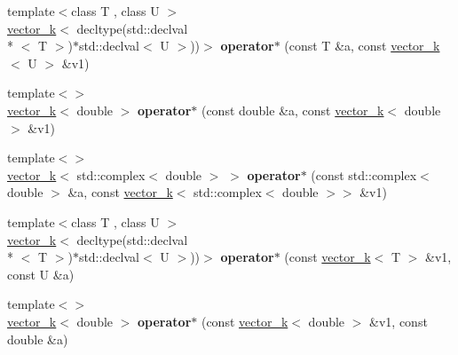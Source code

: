 \begin{DoxyCompactItemize}
\item 
\hypertarget{namespacekeycpp_a6e4d2d791a5cbcbcf90de5da2250b4c8}{{\footnotesize template$<$class T , class U $>$ }\\\hyperlink{classkeycpp_1_1vector__k}{vector\-\_\-k}$<$ decltype(std\-::declval\\*
$<$ T $>$)$\ast$std\-::declval$<$ U $>$))$>$ {\bfseries operator$\ast$} (const T \&a, const \hyperlink{classkeycpp_1_1vector__k}{vector\-\_\-k}$<$ U $>$ \&v1)}\label{namespacekeycpp_a6e4d2d791a5cbcbcf90de5da2250b4c8}

\item 
\hypertarget{namespacekeycpp_ac7a042d0e04e0c610b5798017c8196d9}{{\footnotesize template$<$$>$ }\\\hyperlink{classkeycpp_1_1vector__k}{vector\-\_\-k}$<$ double $>$ {\bfseries operator$\ast$} (const double \&a, const \hyperlink{classkeycpp_1_1vector__k}{vector\-\_\-k}$<$ double $>$ \&v1)}\label{namespacekeycpp_ac7a042d0e04e0c610b5798017c8196d9}

\item 
\hypertarget{namespacekeycpp_a06de45116e1111f3aca66cd18565e9ba}{{\footnotesize template$<$$>$ }\\\hyperlink{classkeycpp_1_1vector__k}{vector\-\_\-k}$<$ std\-::complex$<$ double $>$ $>$ {\bfseries operator$\ast$} (const std\-::complex$<$ double $>$ \&a, const \hyperlink{classkeycpp_1_1vector__k}{vector\-\_\-k}$<$ std\-::complex$<$ double $>$$>$ \&v1)}\label{namespacekeycpp_a06de45116e1111f3aca66cd18565e9ba}

\item 
\hypertarget{namespacekeycpp_a05f53ae281350225540bf5b4f4d1259b}{{\footnotesize template$<$class T , class U $>$ }\\\hyperlink{classkeycpp_1_1vector__k}{vector\-\_\-k}$<$ decltype(std\-::declval\\*
$<$ T $>$)$\ast$std\-::declval$<$ U $>$))$>$ {\bfseries operator$\ast$} (const \hyperlink{classkeycpp_1_1vector__k}{vector\-\_\-k}$<$ T $>$ \&v1, const U \&a)}\label{namespacekeycpp_a05f53ae281350225540bf5b4f4d1259b}

\item 
\hypertarget{namespacekeycpp_ad7f693a660597bd39cdca67ea4000a81}{{\footnotesize template$<$$>$ }\\\hyperlink{classkeycpp_1_1vector__k}{vector\-\_\-k}$<$ double $>$ {\bfseries operator$\ast$} (const \hyperlink{classkeycpp_1_1vector__k}{vector\-\_\-k}$<$ double $>$ \&v1, const double \&a)}\label{namespacekeycpp_ad7f693a660597bd39cdca67ea4000a81}


\end{DoxyCompactItemize}
